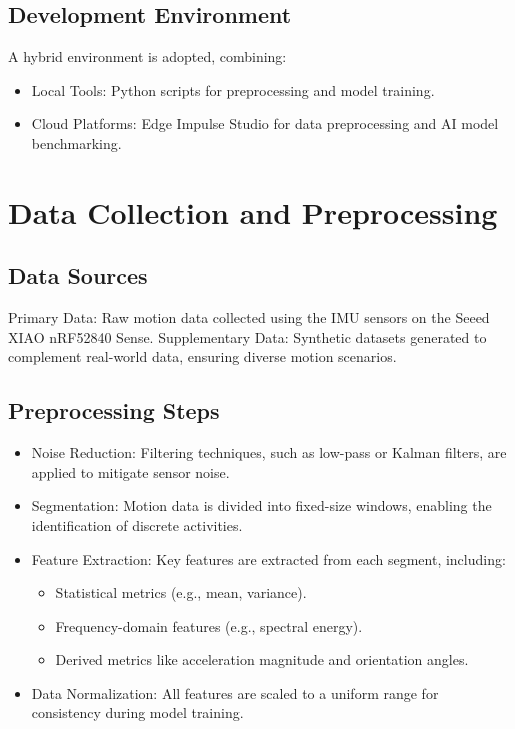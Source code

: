 \subsection{Development Environment}
A hybrid environment is adopted, combining:

\begin{itemize}
    \item Local Tools: Python scripts for preprocessing and model training.
    \item Cloud Platforms: Edge Impulse Studio for data preprocessing and AI model benchmarking.
\end{itemize}

\section{Data Collection and Preprocessing}
\subsection{Data Sources}
Primary Data:
Raw motion data collected using the IMU sensors on the Seeed XIAO nRF52840 Sense.
Supplementary Data:
Synthetic datasets generated to complement real-world data, ensuring diverse motion scenarios.
\subsection{Preprocessing Steps}
\begin{itemize}
    \item Noise Reduction:
     Filtering techniques, such as low-pass or Kalman filters, are applied to mitigate sensor noise.
    \item Segmentation:
    Motion data is divided into fixed-size windows, enabling the identification of discrete activities.
    \item Feature Extraction:
    Key features are extracted from each segment, including:
    \begin{itemize}
        \item Statistical metrics (e.g., mean, variance).
        \item Frequency-domain features (e.g., spectral energy).
        \item Derived metrics like acceleration magnitude and orientation angles.
    \end{itemize}
    \item Data Normalization:
    All features are scaled to a uniform range for consistency during model training.
\end{itemize}

